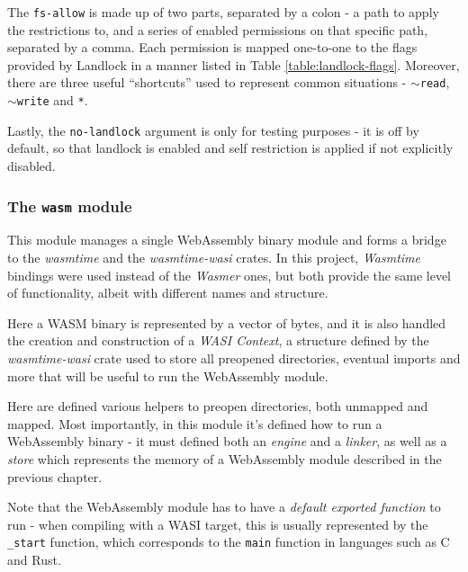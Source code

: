 The \texttt{fs-allow} is made up of two parts, separated by a colon - a path to apply the restrictions to,
and a series of enabled permissions on that specific path, separated by a comma.
Each permission is mapped one-to-one to the flags provided by Landlock in a manner listed in Table \ref{table:landlock-flags}.
Moreover, there are three useful ``shortcuts'' used to represent common situations - \texttt{$\sim$read}, \texttt{$\sim$write} and \texttt{*}.

Lastly, the \texttt{no-landlock} argument is only for testing purposes - it is off by default, so that
landlock is enabled and self restriction is applied if not explicitly disabled.

\subsubsection{The \texttt{wasm} module}

This module manages a single WebAssembly binary module and forms a bridge to the \textit{wasmtime} and the \textit{wasmtime-wasi}
crates. In this project, \textit{Wasmtime} bindings were used instead of the \textit{Wasmer} ones, but both provide the
same level of functionality, albeit with different names and structure.

Here a WASM binary is represented by a vector of bytes, and it is also handled the creation
and construction of a \textit{WASI Context}, a structure defined by the \textit{wasmtime-wasi} crate used to store
all preopened directories, eventual imports and more that will be useful to run the WebAssembly module.

Here are defined various helpers to preopen directories, both unmapped and mapped.
Most importantly, in this module it's defined how to run a WebAssembly binary - it must defined both an \textit{engine} and a \textit{linker},
as well as a \textit{store} which represents the memory of a WebAssembly module described in the previous chapter.

Note that the WebAssembly module has to have a \textit{default exported function} to run - when compiling with a WASI target,
this is usually represented by the \texttt{\_start} function, which corresponds to the \texttt{main} function in languages
such as C and Rust.

